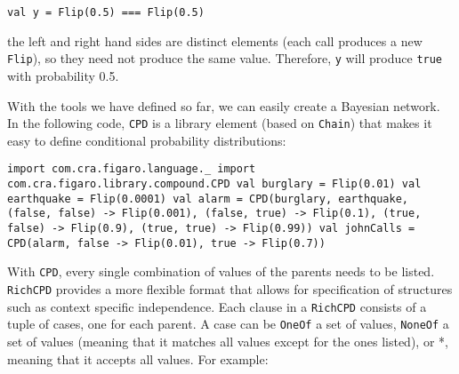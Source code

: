 \begin{flushleft}
\texttt{val y = Flip(0.5) === Flip(0.5)}
\end{flushleft}

the left and right hand sides are distinct elements (each call produces a new \texttt{Flip}), so they need not produce the same value. Therefore, \texttt{y} will produce \texttt{true} with probability 0.5.

With the tools we have defined so far, we can easily create a Bayesian network. In the following code, \texttt{CPD} is a library element (based on \texttt{Chain}) that makes it easy to define conditional probability distributions:

\begin{flushleft}
\texttt{import com.cra.figaro.language.\_
\newline import com.cra.figaro.library.compound.CPD
\newline
\newline val burglary = Flip(0.01)
\newline
\newline val earthquake = Flip(0.0001)
\newline
\newline val alarm = CPD(burglary, earthquake,
\newline \tab (false, false) -> Flip(0.001),
\newline \tab (false, true) -> Flip(0.1), 
\newline \tab (true, false) -> Flip(0.9), 
\newline \tab (true, true) -> Flip(0.99))
\newline 
\newline val johnCalls = CPD(alarm,
\newline \tab false -> Flip(0.01),
\newline \tab true -> Flip(0.7))}
\end{flushleft}

With \texttt{CPD}, every single combination of values of the parents needs to be listed. \texttt{RichCPD} provides a more flexible format that allows for specification of structures such as context specific independence. Each clause in a \texttt{RichCPD} consists of a tuple of cases, one for each parent. A case can be \texttt{OneOf} a set of values, \texttt{NoneOf} a set of values (meaning that it matches all values except for the ones listed), or *, meaning that it accepts all values. For example:

